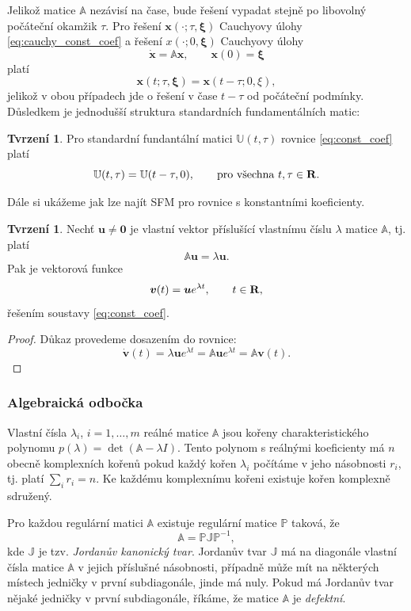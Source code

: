 \documentclass[a4paper, 12pt]{book}
\theoremstyle{definition}
\newtheorem{proposition}[theorem]{Tvrzení}
\def\Real{{\rm\bf R}}
\def\vc#1{\mathbf{\boldsymbol{#1}}}     %
\def\tn#1{{\mathbb{#1}}}    %
\def\df#1{\emph{#1}}
\begin{document}
Jelikož matice $\tn A$ nezávisí na čase, bude řešení vypadat stejně po libovolný počáteční okamžik $\tau$. Pro řešení $\vc x(\cdot;\tau, \vc \xi)$ 
Cauchyovy úlohy \eqref{eq:cauchy_const_coef} a řešení $x(\cdot; 0, \vc \xi)$ Cauchyovy úlohy
    \begin{equation}
        \dot{\vc x} = {\tn A}\vc x,\qquad \vc x(0)=\vc\xi
    \end{equation}
platí
\[
   \vc x(t;\tau, \vc \xi) = \vc x(t - \tau; 0, \xi),
\]
jelikož v obou případech jde o řešení v čase $t - \tau$ od počáteční podmínky. Důsledkem je jednodušší struktura standardních fundamentálních matic:
\begin{proposition}

Pro standardní fundantální matici $\tn U(t,\tau)$ rovnice \eqref{eq:const_coef}
platí
\[
    {\tn U}(t,\tau)={\tn U}(t-\tau,0),\qquad \text{pro všechna }t,\tau\in \Real.
\]
\end{proposition}

Dále si ukážeme jak lze najít SFM pro rovnice s konstantními koeficienty. 
\begin{proposition}
\label{prop:jedno_reseni}
Nechť $\vc u\ne \vc 0$ je vlastní vektor příslušící vlastnímu číslu $\lambda$ matice $\tn A$, tj. platí
\[
  \tn A \vc u = \lambda \vc u.
\]
Pak je vektorová funkce
\begin{equation}
\vc v(t)=\vc u e^{\lambda t},\qquad      t\in \Real,
\end{equation}
řešením soustavy \eqref{eq:const_coef}.
\end{proposition}
\begin{proof}
Důkaz provedeme dosazením do rovnice:
\[
  \dot{\vc v}(t) = \lambda \vc u e^{\lambda t} = \tn A \vc u e^{\lambda t} = \tn A \vc v(t).
\]
\end{proof}

\subsubsection{Algebraická odbočka}
Vlastní čísla $\lambda_i$, $i=1,\dots, m$ reálné matice $\tn A$ jsou kořeny charakteristického polynomu $p(\lambda) = \det(\tn A-\lambda I)$. 
Tento polynom s reálnými koeficienty má $n$ obecně komplexních kořenů pokud každý kořen $\lambda_i$ počítáme v jeho násobnosti $r_i$, tj. platí $\sum_i r_i = n$. 
Ke každému komplexnímu kořeni existuje kořen komplexně sdružený. 

Pro každou regulární matici $\tn A$ existuje regulární matice $\tn P$ taková, že
\begin{equation}
   \label{eq:Jrozklad}
   \tn A = \tn P \tn J \tn P^{-1},
\end{equation}
kde $\tn J$ je tzv. \df{Jordanův kanonický tvar}. Jordanův tvar $\tn J$ 
má na diagonále vlastní čísla matice $\tn A$ v jejich příslušné násobnosti, případně může mít na některých místech jedničky v první subdiagonále, jinde má nuly.
Pokud má Jordanův tvar nějaké jedničky v první subdiagonále, říkáme, že matice $\tn A$ je \df{defektní}. 
\end{document}
